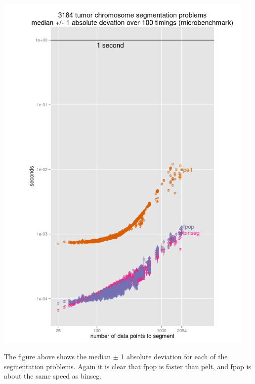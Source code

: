 \documentclass{article}
\begin{document}
\begin{center}
  \includegraphics[width=5in]{figure-microbenchmark-arrays-median}
\end{center}

The figure above shows the median $\pm$ 1 absolute deviation for each
of the segmentation problems. Again it is clear that fpop is faster
than pelt, and fpop is about the same speed as binseg.
\end{document}
